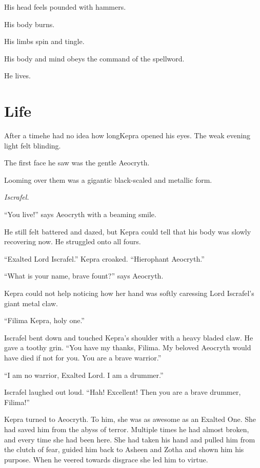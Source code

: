 \documentclass
  [a4paper,
   12pt,
   oneside
  ]%
  {article}
\begin{document}
His head feels pounded with hammers. 

His body burns. 

His limbs spin and tingle. %

His body and mind obeys the command of the spellword. 

He lives.



\section{Life}

After a time\dash{}he had no idea how long\dash{}Kepra opened his eyes. 
The weak evening light felt blinding. 

The first face he saw was the gentle Aeocryth. 

Looming over them was a gigantic black-scaled and metallic form.

\emph{Iscrafel.}



``You live!'' says Aeocryth with a beaming smile. 

He still felt battered and dazed, but Kepra could tell that his body was slowly recovering now. 
He struggled onto all fours. 

``Exalted Lord Iscrafel.'' Kepra croaked. ``Hierophant Aeocryth.''

``What is your name, brave fount?'' says Aeocryth. 

Kepra could not help noticing how her hand was softly caressing Lord Iscrafel’s giant metal claw.

``Filima Kepra, holy one.'' 

Iscrafel bent down and touched Kepra's shoulder with a heavy bladed claw. 
He gave a toothy grin.
``You have my thanks, Filima. My beloved Aeocryth would have died if not for you. You are a brave warrior.'' 

``I am no warrior, Exalted Lord. I am a drummer.''

Iscrafel laughed out loud. ``Hah! Excellent! Then you are a brave drummer, Filima!'' 

Kepra turned to Aeocryth. 
To him, she was as awesome as an Exalted One. 
She had saved him from the abyss of terror. 
Multiple times he had almost broken, and every time she had been here.
She had taken his hand and pulled him from the clutch of fear, guided him back to Asheen and Zotha and shown him his purpose.
When he veered towards disgrace she led him to virtue.
\end{document}
